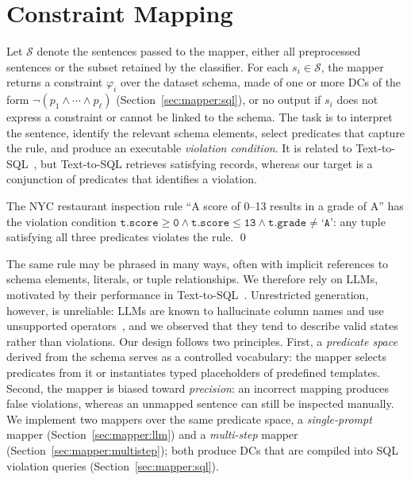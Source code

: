 \section{Constraint Mapping}
\label{sec:mapper}

Let $\mathcal{S}$ denote the sentences passed to the mapper, either all preprocessed sentences or the subset retained by the classifier. For each $s_i \in \mathcal{S}$, the mapper returns a constraint $\varphi_i$ over the dataset schema, made of one or more DCs of the form $\neg(p_1 \land \cdots \land p_\ell)$ (Section~\ref{sec:mapper:sql}), or no output if $s_i$ does not express a constraint or cannot be linked to the schema. The task is to interpret the sentence, identify the relevant schema elements, select predicates that capture the rule, and produce an executable \emph{violation condition}. It is related to Text-to-SQL~\cite{yu2018spider}, but Text-to-SQL retrieves satisfying records, whereas our target is a conjunction of predicates that identifies a violation.

\begin{example}
\label{ex:mapping}
The NYC restaurant inspection rule ``A score of 0--13 results in a grade of A'' has the violation condition
$\texttt{t.score} \geq \texttt{0} \land \texttt{t.score} \leq \texttt{13} \land \texttt{t.grade} \neq \texttt{`A'}$: any tuple satisfying all three predicates violates the rule. \qed
\end{example}

The same rule may be phrased in many ways, often with implicit references to schema elements, literals, or tuple relationships. We therefore rely on LLMs, motivated by their performance in Text-to-SQL~\cite{llmTEXT2SQLSurvey2025}. Unrestricted generation, however, is unreliable: LLMs are known to hallucinate column names and use unsupported operators~\cite{dail2025,llmTEXT2SQLSurvey2025,DBLP:conf/dexa/DociniAO25}, and we observed that they tend to describe valid states rather than violations. Our design follows two principles. First, a \emph{predicate space} derived from the schema serves as a controlled vocabulary: the mapper selects predicates from it or instantiates typed placeholders of predefined templates. Second, the mapper is biased toward \emph{precision}: an incorrect mapping produces false violations, whereas an unmapped sentence can still be inspected manually. We implement two mappers over the same predicate space, a \emph{single-prompt} mapper (Section~\ref{sec:mapper:llm}) and a \emph{multi-step} mapper (Section~\ref{sec:mapper:multistep}); both produce DCs that are compiled into SQL violation queries (Section~\ref{sec:mapper:sql}).

